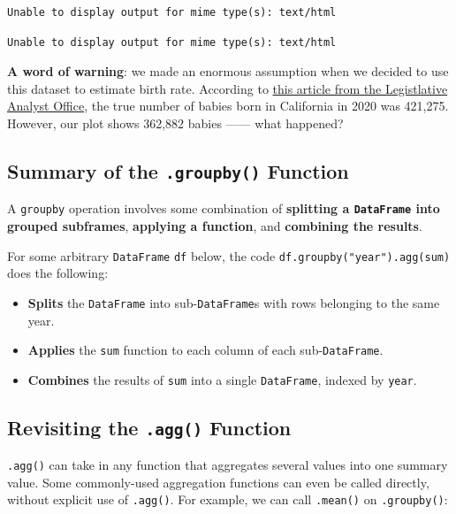 \documentclass[
  letterpaper,
  DIV=11,
  numbers=noendperiod]{scrreprt}
\providecommand{\tightlist}{%
  \setlength{\itemsep}{0pt}\setlength{\parskip}{0pt}}\usepackage{longtable,booktabs,array}
\begin{document}
\begin{verbatim}
Unable to display output for mime type(s): text/html
\end{verbatim}

\begin{verbatim}
Unable to display output for mime type(s): text/html
\end{verbatim}

\textbf{A word of warning}: we made an enormous assumption when we
decided to use this dataset to estimate birth rate. According to
\href{https://lao.ca.gov/LAOEconTax/Article/Detail/691}{this article
from the Legistlative Analyst Office}, the true number of babies born in
California in 2020 was 421,275. However, our plot shows 362,882 babies
------ what happened?

\subsection{\texorpdfstring{Summary of the \texttt{.groupby()}
Function}{Summary of the .groupby() Function}}\label{summary-of-the-.groupby-function}

A \texttt{groupby} operation involves some combination of
\textbf{splitting a \texttt{DataFrame} into grouped subframes},
\textbf{applying a function}, and \textbf{combining the results}.

For some arbitrary \texttt{DataFrame} \texttt{df} below, the code
\texttt{df.groupby("year").agg(sum)} does the following:

\begin{itemize}
\tightlist
\item
  \textbf{Splits} the \texttt{DataFrame} into sub-\texttt{DataFrame}s
  with rows belonging to the same year.
\item
  \textbf{Applies} the \texttt{sum} function to each column of each
  sub-\texttt{DataFrame}.
\item
  \textbf{Combines} the results of \texttt{sum} into a single
  \texttt{DataFrame}, indexed by \texttt{year}.
\end{itemize}

\subsection{\texorpdfstring{Revisiting the \texttt{.agg()}
Function}{Revisiting the .agg() Function}}\label{revisiting-the-.agg-function}

\texttt{.agg()} can take in any function that aggregates several values
into one summary value. Some commonly-used aggregation functions can
even be called directly, without explicit use of \texttt{.agg()}. For
example, we can call \texttt{.mean()} on \texttt{.groupby()}:
\end{document}
